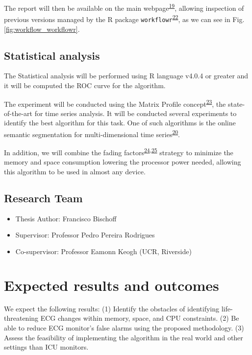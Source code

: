 \documentclass[12pt,twoside]{reedthesis}
\providecommand{\tightlist}{%
  \setlength{\itemsep}{0pt}\setlength{\parskip}{0pt}}
\begin{document}
The report will then be available on the main webpage\textsuperscript{\protect\hyperlink{ref-franz_website}{19}}, allowing inspection of previous versions managed
by the R package \texttt{workflowr}\textsuperscript{\protect\hyperlink{ref-workflowr2021}{22}}, as we can see in Fig. \ref{fig:workflow_workflowr}.

\hypertarget{statistical-analysis}{%
\subsection{Statistical analysis}\label{statistical-analysis}}

The Statistical analysis will be performed using R language v4.0.4 or greater and it will be computed the ROC curve for
the algorithm.

The experiment will be conducted using the Matrix Profile concept\textsuperscript{\protect\hyperlink{ref-yeh2016}{23}}, the state-of-the-art for time series
analysis. It will be conducted several experiments to identify the best algorithm for this task. One of such algorithms
is the online semantic segmentation for multi-dimensional time series\textsuperscript{\protect\hyperlink{ref-gharghabi2018}{20}}.

In addition, we will combine the fading factors\textsuperscript{\protect\hyperlink{ref-Gama2013}{24},\protect\hyperlink{ref-Rodrigues2010}{25}} strategy to minimize the memory and space
consumption lowering the processor power needed, allowing this algorithm to be used in almost any device.

\hypertarget{research-team}{%
\subsection{Research Team}\label{research-team}}
\begin{itemize}
\tightlist
\item
  Thesis Author: Francisco Bischoff
\item
  Supervisor: Professor Pedro Pereira Rodrigues
\item
  Co-supervisor: Professor Eamonn Keogh (UCR, Riverside)
\end{itemize}
\hypertarget{expected-results-and-outcomes}{%
\section{Expected results and outcomes}\label{expected-results-and-outcomes}}

We expect the following results: (1) Identify the obstacles of identifying life-threatening ECG changes within memory,
space, and CPU constraints. (2) Be able to reduce ECG monitor's false alarms using the proposed methodology. (3) Assess
the feasibility of implementing the algorithm in the real world and other settings than ICU monitors.
\end{document}
